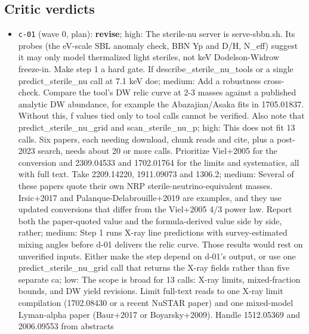 \documentclass[11pt,a4paper]{article}
\begin{document}
\subsection{Critic verdicts}
\begin{itemize}
  \item \texttt{c-01} (wave 0, plan): \textbf{revise}; high: The sterile-nu server is serve-sbbn.sh. Its probes (the eV-scale SBL anomaly check, BBN Yp and D/H, N\_eff) suggest it may only model thermalized light steriles, not keV Dodelson-Widrow freeze-in. Make step 1 a hard gate. If describe\_sterile\_nu\_tools or a single predict\_sterile\_nu call at 7.1 keV doe; medium: Add a robustness cross-check. Compare the tool's DW relic curve at 2-3 masses against a published analytic DW abundance, for example the Abazajian/Asaka fits in 1705.01837. Without this, f values tied only to tool calls cannot be verified. Also note that predict\_sterile\_nu\_grid and scan\_sterile\_nu\_p; high: This does not fit 13 calls. Six papers, each needing download, chunk reads and cite, plus a post-2023 search, needs about 20 or more calls. Prioritize Viel+2005 for the conversion and 2309.04533 and 1702.01764 for the limits and systematics, all with full text. Take 2209.14220, 1911.09073 and 1306.2; medium: Several of these papers quote their own NRP sterile-neutrino-equivalent masses. Irsic+2017 and Palanque-Delabrouille+2019 are examples, and they use updated conversions that differ from the Viel+2005 4/3 power law. Report both the paper-quoted value and the formula-derived value side by side, rather; medium: Step 1 runs X-ray line predictions with survey-estimated mixing angles before d-01 delivers the relic curve. Those results would rest on unverified inputs. Either make the step depend on d-01's output, or use one predict\_sterile\_nu\_grid call that returns the X-ray fields rather than five separate ca; low: The scope is broad for 13 calls: X-ray limits, mixed-fraction bounds, and DW yield revisions. Limit full-text reads to one X-ray limit compilation (1702.08430 or a recent NuSTAR paper) and one mixed-model Lyman-alpha paper (Baur+2017 or Boyarsky+2009). Handle 1512.05369 and 2006.09553 from abstracts

\end{itemize}
\end{document}
